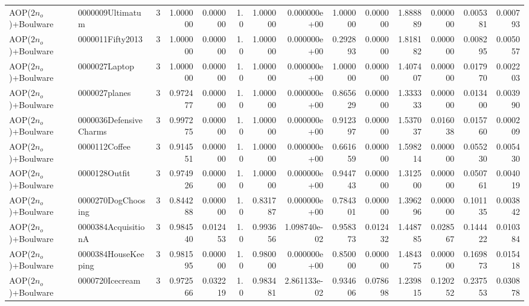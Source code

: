 \begin{tabular}{llrr|r|rr|rr|rr|rrr}
    AOP($2 n_o$)+Boulware &       0000009Ultimatum &       3 & 1.000000 & 0.000000 &  1.0 &      1.000000 & 0.000000e+00 &      1.000000 & 0.000000 &      1.888889 &    0.000000 &     0.005381 &    0.000793 \\
    AOP($2 n_o$)+Boulware &       0000011Fifty2013 &       3 & 1.000000 & 0.000000 &  1.0 &      1.000000 & 0.000000e+00 &      0.292893 & 0.000000 &      1.818182 &    0.000000 &     0.008295 &    0.005057 \\
    AOP($2 n_o$)+Boulware &          0000027Laptop &       3 & 1.000000 & 0.000000 &  1.0 &      1.000000 & 0.000000e+00 &      1.000000 & 0.000000 &      1.407407 &    0.000000 &     0.017970 &    0.002203 \\
    AOP($2 n_o$)+Boulware &          0000027planes &       3 & 0.972477 & 0.000000 &  1.0 &      1.000000 & 0.000000e+00 &      0.865629 & 0.000000 &      1.333333 &    0.000000 &     0.013400 &    0.003990 \\
    AOP($2 n_o$)+Boulware & 0000036DefensiveCharms &       3 & 0.997275 & 0.000000 &  1.0 &      1.000000 & 0.000000e+00 &      0.912397 & 0.000000 &      1.537037 &    0.016038 &     0.015760 &    0.000209 \\
    AOP($2 n_o$)+Boulware &          0000112Coffee &       3 & 0.914551 & 0.000000 &  1.0 &      1.000000 & 0.000000e+00 &      0.661659 & 0.000000 &      1.598214 &    0.000000 &     0.055230 &    0.005430 \\
    AOP($2 n_o$)+Boulware &          0000128Outfit &       3 & 0.974926 & 0.000000 &  1.0 &      1.000000 & 0.000000e+00 &      0.944743 & 0.000000 &      1.312500 &    0.000000 &     0.050761 &    0.004019 \\
    AOP($2 n_o$)+Boulware &     0000270DogChoosing &       3 & 0.844288 & 0.000000 &  1.0 &      0.831787 & 0.000000e+00 &      0.784301 & 0.000000 &      1.396296 &    0.000000 &     0.101135 &    0.003842 \\
    AOP($2 n_o$)+Boulware &    0000384AcquisitionA &       3 & 0.984540 & 0.012453 &  1.0 &      0.993656 & 1.098740e-02 &      0.958373 & 0.012432 &      1.448785 &    0.028567 &     0.144422 &    0.010384 \\
    AOP($2 n_o$)+Boulware &    0000384HouseKeeping &       3 & 0.981595 & 0.000000 &  1.0 &      0.980000 & 0.000000e+00 &      0.850000 & 0.000000 &      1.484375 &    0.000000 &     0.169873 &    0.015418 \\
    AOP($2 n_o$)+Boulware &        0000720Icecream &       3 & 0.972566 & 0.032219 &  1.0 &      0.983481 & 2.861133e-02 &      0.934606 & 0.078698 &      1.239815 &    0.120252 &     0.237553 &    0.030878 \\

\end{tabular}
